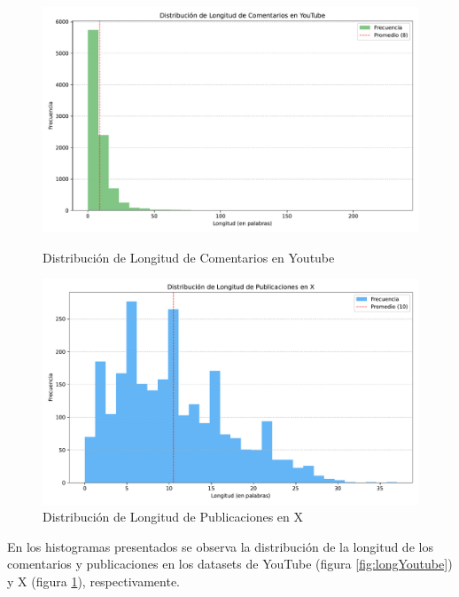 \documentclass[10pt, a4paper]{article}
\begin{document}
	\begin{figure}[h!]
		\centering
		\begin{minipage}{0.49\textwidth} %
			\includegraphics[width=\linewidth]{longitud_comentarios_youtube.pdf} 
			\vspace{-2mm}
			\caption{Distribución de Longitud de Comentarios en Youtube}
			\label{fig:longYoutube}
		\end{minipage}
		\hfill %
		\begin{minipage}{0.49\textwidth}
			\includegraphics[width=\linewidth]{longitud_publicaciones_x.pdf}
			\vspace{-2mm}
			\caption{Distribución de Longitud de Publicaciones en X}
			\label{fig:longX}
		\end{minipage}
	\end{figure}
	
	
	En los histogramas presentados se observa la distribución de la longitud de los comentarios y publicaciones en los datasets de YouTube (figura \ref{fig:longYoutube}) y X (figura \ref{fig:longX}), respectivamente.
	
\end{document}
